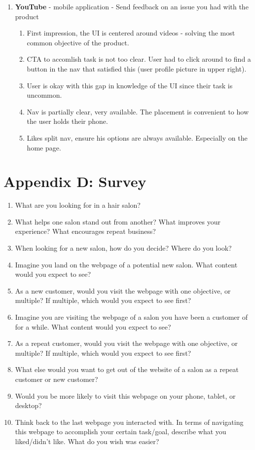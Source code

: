 \begin{enumerate}
\item
  \textbf{YouTube} - mobile application - Send feedback on an issue you had with the product
  \begin{enumerate}
  \item
    First impression, the UI is centered around videos - solving the most common objective of the product.
  \item
    CTA to accomlish task is not too clear. User had to click around to find a button in the nav that satisfied this (user profile picture in upper right).
  \item
    User is okay with this gap in knowledge of the UI since their task is uncommon.
  \item
    Nav is partially clear, very available. The placement is convenient to how the user holds their phone.
  \item
    Likes split nav, ensure his options are always available. Especially on the home page.
  \end{enumerate}
\end{enumerate}


\section{Appendix D: Survey}
\begin{enumerate}
\item
  What are you looking for in a hair salon?
\item
  What helps one salon stand out from another? What improves your experience? What encourages repeat business?
\item
  When looking for a new salon, how do you decide? Where do you look?
\item
  Imagine you land on the webpage of a potential new salon. What content would you expect to see?
\item
  As a new customer, would you visit the webpage with one objective, or multiple? If multiple, which would you expect to see first?
\item
  Imagine you are visiting the webpage of a salon you have been a customer of for a while. What content would you expect to see?
\item
  As a repeat customer, would you visit the webpage with one objective, or multiple? If multiple, which would you expect to see first?
\item
  What else would you want to get out of the website of a salon as a repeat customer or new customer?
\item
  Would you be more likely to visit this webpage on your phone, tablet, or desktop?
\item
  Think back to the last webpage you interacted with. In terms of navigating this webpage to accomplish your certain task/goal, describe what you liked/didn't like. What do you wish was easier?
\end{enumerate}


